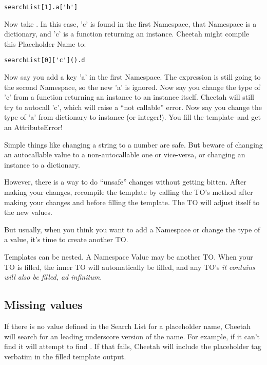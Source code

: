 \begin{verbatim}
searchList[1].a['b']
\end{verbatim}

Now take .  In this case, 'c' is found in the first Namespace, that
Namespace is a dictionary, and 'c' is a function returning an instance.
Cheetah might compile this Placeholder Name to:

\begin{verbatim}
searchList[0]['c']().d
\end{verbatim}

Now say you add a key 'a' in the first Namespace.  The expression is still
going to the second Namespace, so the new 'a' is ignored.  Now say you change
the type of 'c' from a function returning an instance to an instance itself.
Cheetah will still try to autocall 'c', which will raise a ``not callable''
error.  Now say you change the type of 'a' from dictionary to instance
(or integer!).  You fill the template--and get an AttributeError!

Simple things like changing a string to a number are safe.  But beware of
changing an autocallable value to a non-autocallable one or vice-versa, or
changing an instance to a dictionary.  

However, there is a way to do ``unsafe'' changes without getting bitten.  After
making your changes, recompile the template by calling the TO's
 method after making your changes and before filling the
template.  The TO will adjust itself to the new values.

But usually, when you think you want to add a Namespace or change the type
of a value, it's time to create another TO.

Templates can be nested.  A Namespace Value may be another TO.  When your TO
is filled, the inner TO will automatically be filled, and any TO's \em{it}
contains will also be filled, ad infinitum.


\subsection{Missing values}

If there is no value defined in the Search List for a placeholder name,
Cheetah will search for an leading underscore version of the name.  For
example, if it can't find  it will attempt to find
.  If that fails, Cheetah will include the placeholder
tag verbatim in the filled template output.

